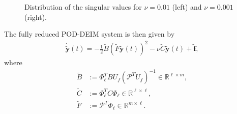 \begin{figure}[H]
\centering
{}\hfill
{}\hfill
\caption{Distribution of the singular values for $\nu = 0.01$ (left) and $\nu = 0.001$ (right).}\label{singVal}
\end{figure}
\noindent
The fully reduced POD-DEIM system is then given by
\begin{align}
\label{finalPODDEIM}
\mathbf{\dot{\tilde y}}(t) = -\frac{1}{2} \tilde B (\tilde F \mathbf{\tilde y}(t))^2 - \nu \tilde C \mathbf{\tilde y}(t) + \mathbf{\tilde f},
\end{align}
where
\begin{align}
\label{Bred}
\tilde{B} &:= \Phi_\ell^T B U_f(\mathcal{P}^T U_f)^{-1} \in \mathbb{R}^{\ell \times m},\\
\label{Cred}
\tilde{C} &:= \Phi_\ell^T C \Phi_\ell \in \mathbb{R}^{\ell \times \ell},\\
\label{Fred}
\tilde{F} &:= \mathcal{P}^T \Phi_\ell \in \mathbb{R}^{m \times \ell}.
\end{align}

